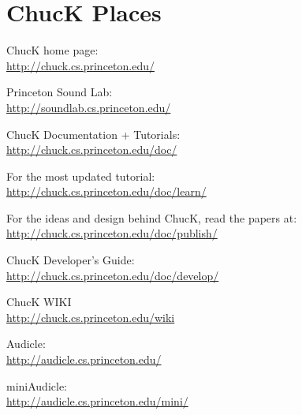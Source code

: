 \newpage
\section{ChucK Places}


ChucK home page:\\
\urltab    \href{http://chuck.cs.princeton.edu/}{http://chuck.cs.princeton.edu/}

Princeton Sound Lab:\\
\urltab    \href{http://soundlab.cs.princeton.edu/}{http://soundlab.cs.princeton.edu/}  
    
ChucK Documentation + Tutorials:\\
\urltab    \href{http://chuck.cs.princeton.edu/doc/}{http://chuck.cs.princeton.edu/doc/}
    
For the most updated tutorial:\\
\urltab    \href{http://chuck.cs.princeton.edu/doc/learn/}{http://chuck.cs.princeton.edu/doc/learn/}
    
For the ideas and design behind ChucK, read the papers at:\\
\urltab    \href{http://chuck.cs.princeton.edu/doc/publish/}{http://chuck.cs.princeton.edu/doc/publish/}
    
ChucK Developer's Guide:\\
\urltab    \href{http://chuck.cs.princeton.edu/doc/develop/}{http://chuck.cs.princeton.edu/doc/develop/}

ChucK WIKI\\
\urltab    \href{http://chuck.cs.princeton.edu/wiki}{http://chuck.cs.princeton.edu/wiki}

Audicle:\\
\urltab    \href{http://audicle.cs.princeton.edu/}{http://audicle.cs.princeton.edu/}

miniAudicle:\\
\urltab    \href{http://audicle.cs.princeton.edu/mini/}{http://audicle.cs.princeton.edu/mini/}